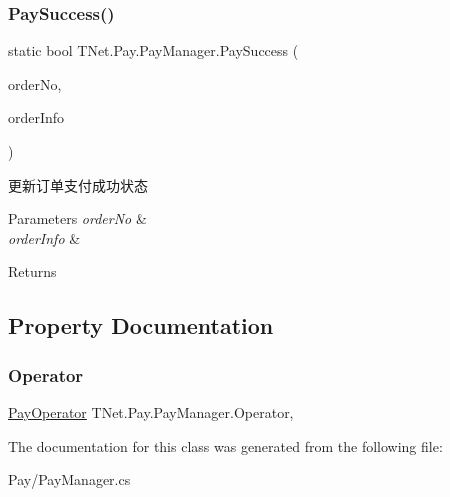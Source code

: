 \subsubsection{\texorpdfstring{Pay\+Success()}{PaySuccess()}}
{\footnotesize\ttfamily static bool T\+Net.\+Pay.\+Pay\+Manager.\+Pay\+Success (\begin{DoxyParamCaption}\item[{string}]{order\+No,  }\item[{\mbox{\hyperlink{class_t_net_1_1_pay_1_1_order_info}{Order\+Info}}}]{order\+Info }\end{DoxyParamCaption})\hspace{0.3cm}{\ttfamily [static]}}



更新订单支付成功状态 


\begin{DoxyParams}{Parameters}
{\em order\+No} & \\
\hline
{\em order\+Info} & \\
\hline
\end{DoxyParams}
\begin{DoxyReturn}{Returns}

\end{DoxyReturn}


\subsection{Property Documentation}
\mbox{\label{class_t_net_1_1_pay_1_1_pay_manager_acf2fef0bec3662e64f9da07d2a36b7ce}} 
\subsubsection{\texorpdfstring{Operator}{Operator}}
{\footnotesize\ttfamily \mbox{\hyperlink{class_t_net_1_1_pay_1_1_pay_operator}{Pay\+Operator}} T\+Net.\+Pay.\+Pay\+Manager.\+Operator\hspace{0.3cm}{\ttfamily [static]}, {\ttfamily [get]}}







The documentation for this class was generated from the following file\+:\begin{DoxyCompactItemize}
\item 
Pay/Pay\+Manager.\+cs\end{DoxyCompactItemize}
